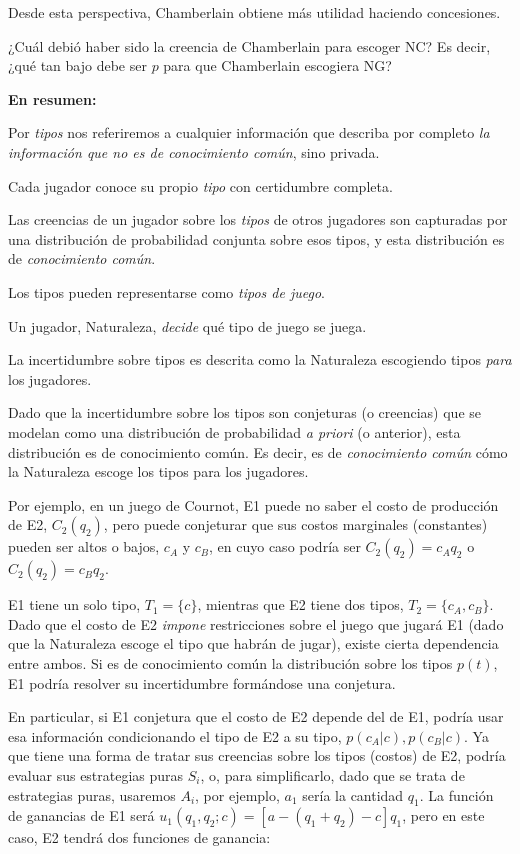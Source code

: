 \documentclass[12pt]{article}
\begin{document}
Desde esta perspectiva, Chamberlain obtiene más utilidad haciendo concesiones.

¿Cuál debió haber sido la creencia de Chamberlain para escoger NC? Es decir, ¿qué tan bajo debe ser $ p $ para que Chamberlain escogiera NG?


\textbf{En resumen:}
\begin{myitemize}
	\item Por \textit{tipos} nos referiremos a cualquier información que describa por completo \textit{la información que no es de conocimiento común}, sino privada.
	\item Cada jugador conoce su propio \textit{tipo} con certidumbre completa.
	\item Las creencias de un jugador sobre los \textit{tipos} de otros jugadores son capturadas por una distribución de probabilidad conjunta sobre esos tipos, y esta distribución es de \textit{conocimiento común}.
	\item Los tipos pueden representarse como \textit{tipos de juego}.
	\item Un jugador, Naturaleza, \textit{decide} qué tipo de juego se juega.
	\item La incertidumbre sobre tipos es descrita como la Naturaleza escogiendo tipos \textit{para} los jugadores.
	\item Dado que la incertidumbre sobre los tipos son conjeturas (o creencias) que se modelan como una distribución de probabilidad \textit{a priori} (o anterior), esta distribución es de conocimiento común. Es decir, es de \textit{conocimiento común} cómo la Naturaleza escoge los tipos para los jugadores.
\end{myitemize}

Por ejemplo, en un juego de Cournot, E1 puede no saber el costo de producción de E2, $C_2(q_2)$, pero puede conjeturar que sus costos marginales (constantes) pueden ser altos o bajos, $c_A$ y $c_B$, en cuyo caso podría ser $C_2(q_2)=c_Aq_2$ o $C_2(q_2)=c_Bq_2$.

E1 tiene un solo tipo,  $T_1 = \{c\}$, mientras que E2 tiene dos tipos, $T_2 = \{c_A, c_B\}$. Dado que el costo de E2 \textit{impone} restricciones sobre el juego que jugará E1 (dado que la Naturaleza escoge el tipo que habrán de jugar), existe cierta dependencia entre ambos. Si es de conocimiento común la distribución sobre los tipos $p(t)$, E1 podría resolver su incertidumbre formándose una conjetura.

En particular, si E1 conjetura que el costo de E2 depende del de E1, podría usar esa información condicionando el tipo de E2 a su tipo, $p(c_A|c), p(c_B|c)$. Ya que tiene una forma de tratar sus creencias sobre los tipos (costos) de E2, podría evaluar sus estrategias puras $S_i$, o, para simplificarlo, dado que se trata de estrategias puras, usaremos $A_i$, por ejemplo, $a_1$ sería la cantidad $q_1$. La función de ganancias de E1 será $u_1(q_1, q_2;c) = [a - (q_1 + q_2) - c]q_1$, pero en este caso, E2 tendrá dos funciones de ganancia:
\end{document}
